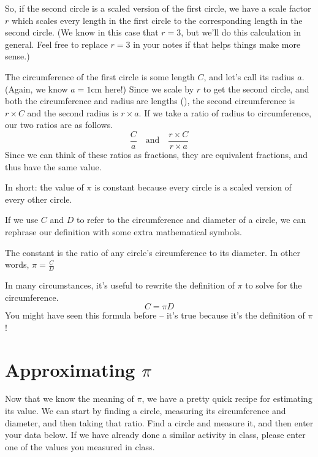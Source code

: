 \documentclass{ximera}
\begin{document}
\begin{example}
So, if the second circle is a scaled version of the first circle, we have a scale factor $r$ which scales every length in the first circle to the corresponding length in the second circle. (We know in this case that $r=3$, but we'll do this calculation in general. Feel free to replace $r=3$ in your notes if that helps things make more sense.)

The circumference of the first circle is some length $C$, and let's call its radius $a$. (Again, we know $a=1$cm here!) Since we scale by $r$ to get the second circle, and both the circumference and radius are lengths (), the second circumference is $r \times C$ and the second radius is $r \times a$. If we take a ratio of radius to circumference, our two ratios are as follows.
\[
\frac{C}{a} \quad \textrm{and} \quad \frac{r\times C}{r\times a}
\]
Since we can think of these ratios as fractions, they are equivalent fractions, and thus have the same value.

\end{example}

In short: the value of $\pi$ is constant because every circle is a scaled version of every other circle.

If we use $C$ and $D$ to refer to the circumference and diameter of a circle, we can rephrase our definition with some extra mathematical symbols.
\begin{definition}
The constant \dfn{$\pi$} is the ratio of any circle's circumference to its diameter. In other words, $\pi = \frac{C}{D}$
\end{definition}
In many circumstances, it's useful to rewrite the definition of $\pi$ to solve for the circumference.
\[
C = \pi D
\]
You might have seen this formula before -- it's true because it's the definition of $\pi$!


\section{Approximating $\pi$}

Now that we know the meaning of $\pi$, we have a pretty quick recipe for estimating its value. We can start by finding a circle, measuring its circumference and diameter, and then taking that ratio. Find a circle and measure it, and then enter your data below. If we have already done a similar activity in class, please enter one of the values you measured in class.
\end{document}

